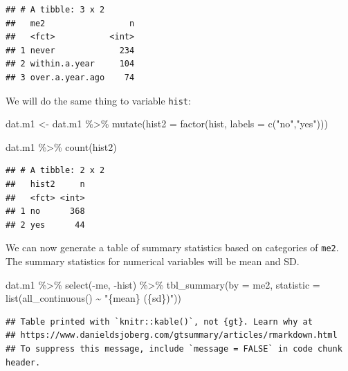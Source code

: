 \documentclass[
  10pt,
]{krantz}
\newenvironment{Shaded}{\begin{snugshade}}{\end{snugshade}}
\newcommand{\AttributeTok}[1]{\textcolor[rgb]{0.77,0.63,0.00}{#1}}
\newcommand{\FunctionTok}[1]{\textcolor[rgb]{0.00,0.00,0.00}{#1}}
\newcommand{\NormalTok}[1]{#1}
\newcommand{\OtherTok}[1]{\textcolor[rgb]{0.56,0.35,0.01}{#1}}
\newcommand{\SpecialCharTok}[1]{\textcolor[rgb]{0.00,0.00,0.00}{#1}}
\newcommand{\StringTok}[1]{\textcolor[rgb]{0.31,0.60,0.02}{#1}}
\begin{document}
\begin{verbatim}
## # A tibble: 3 x 2
##   me2                 n
##   <fct>           <int>
## 1 never             234
## 2 within.a.year     104
## 3 over.a.year.ago    74
\end{verbatim}

We will do the same thing to variable \texttt{hist}:

\begin{Shaded}
\begin{Highlighting}[]
\NormalTok{dat.m1 }\OtherTok{\textless{}{-}} 
\NormalTok{  dat.m1 }\SpecialCharTok{\%\textgreater{}\%} 
  \FunctionTok{mutate}\NormalTok{(}\AttributeTok{hist2 =} \FunctionTok{factor}\NormalTok{(hist,}
                        \AttributeTok{labels =} \FunctionTok{c}\NormalTok{(}\StringTok{"no"}\NormalTok{,}\StringTok{"yes"}\NormalTok{)))}
\end{Highlighting}
\end{Shaded}

\begin{Shaded}
\begin{Highlighting}[]
\NormalTok{dat.m1 }\SpecialCharTok{\%\textgreater{}\%} 
  \FunctionTok{count}\NormalTok{(hist2)}
\end{Highlighting}
\end{Shaded}

\begin{verbatim}
## # A tibble: 2 x 2
##   hist2     n
##   <fct> <int>
## 1 no      368
## 2 yes      44
\end{verbatim}

We can now generate a table of summary statistics based on categories of \texttt{me2}. The summary statistics for numerical variables will be mean and SD.

\begin{Shaded}
\begin{Highlighting}[]
\NormalTok{dat.m1 }\SpecialCharTok{\%\textgreater{}\%}
  \FunctionTok{select}\NormalTok{(}\SpecialCharTok{{-}}\NormalTok{me, }\SpecialCharTok{{-}}\NormalTok{hist) }\SpecialCharTok{\%\textgreater{}\%}
  \FunctionTok{tbl\_summary}\NormalTok{(}\AttributeTok{by =}\NormalTok{ me2,}
              \AttributeTok{statistic =} \FunctionTok{list}\NormalTok{(}\FunctionTok{all\_continuous}\NormalTok{() }\SpecialCharTok{\textasciitilde{}} \StringTok{"\{mean\} (\{sd\})"}\NormalTok{))}
\end{Highlighting}
\end{Shaded}

\begin{verbatim}
## Table printed with `knitr::kable()`, not {gt}. Learn why at
## https://www.danieldsjoberg.com/gtsummary/articles/rmarkdown.html
## To suppress this message, include `message = FALSE` in code chunk header.
\end{verbatim}
\end{document}
